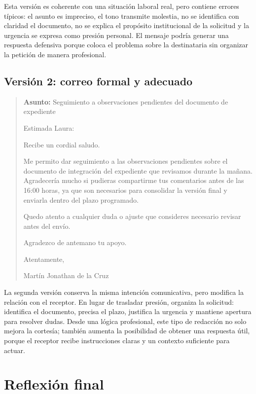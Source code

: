 \documentclass[
	spanish,
	letterpaper, oneside
]{article}
\begin{document}
Esta versión es coherente con una situación laboral real, pero contiene errores típicos: el asunto es impreciso, el tono transmite molestia, no se identifica con claridad el documento, no se explica el propósito institucional de la solicitud y la urgencia se expresa como presión personal. El mensaje podría generar una respuesta defensiva porque coloca el problema sobre la destinataria sin organizar la petición de manera profesional.

\subsection{Versión 2: correo formal y adecuado}

\begin{quote}
\textbf{Asunto:} Seguimiento a observaciones pendientes del documento de expediente

Estimada Laura:

Recibe un cordial saludo.

Me permito dar seguimiento a las observaciones pendientes sobre el documento de integración del expediente que revisamos durante la mañana. Agradecería mucho si pudieras compartirme tus comentarios antes de las 16:00 horas, ya que son necesarios para consolidar la versión final y enviarla dentro del plazo programado.

Quedo atento a cualquier duda o ajuste que consideres necesario revisar antes del envío.

Agradezco de antemano tu apoyo.

Atentamente,

Martín Jonathan de la Cruz
\end{quote}

La segunda versión conserva la misma intención comunicativa, pero modifica la relación con el receptor. En lugar de trasladar presión, organiza la solicitud: identifica el documento, precisa el plazo, justifica la urgencia y mantiene apertura para resolver dudas. Desde una lógica profesional, este tipo de redacción no solo mejora la cortesía; también aumenta la posibilidad de obtener una respuesta útil, porque el receptor recibe instrucciones claras y un contexto suficiente para actuar.

\section{Reflexión final}
\end{document}
